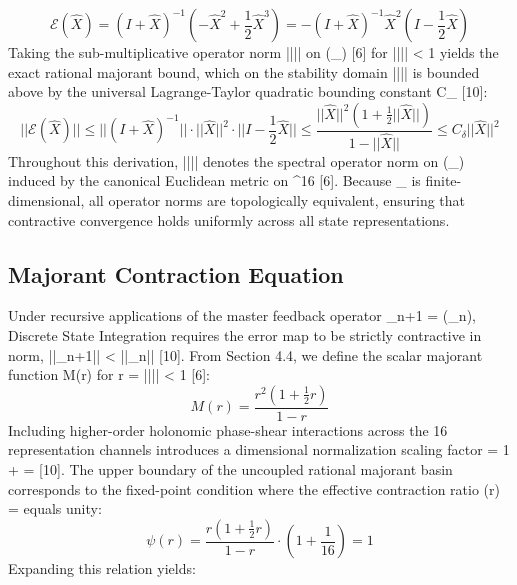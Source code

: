 \documentclass[12pt, a4paper]{article}
\begin{document}
\begin{equation}
\mathcal{E}(\hat{X}) = (I + \hat{X})^{-1}\left(-\hat{X}^{2} + \frac{1}{2}\hat{X}^{3}\right) = -(I + \hat{X})^{-1}\hat{X}^{2}\left(I - \frac{1}{2}\hat{X}\right)
\end{equation}
Taking the sub-multiplicative operator norm ||\cdot|| on (_{}) [6] for |||| < 1 yields the exact rational majorant bound, which on the stability domain |||| \le \delta is bounded above by the universal Lagrange-Taylor quadratic bounding constant C_{\delta}  [10]:
\begin{equation}
||\mathcal{E}(\hat{X})|| \le ||(I + \hat{X})^{-1}|| \cdot ||\hat{X}||^{2} \cdot ||I - \frac{1}{2}\hat{X}|| \le \frac{||\hat{X}||^{2}\left(1 + \frac{1}{2}||\hat{X}||\right)}{1 - ||\hat{X}||} \le C_{\delta}||\hat{X}||^{2}
\end{equation}
Throughout this derivation, ||\cdot|| denotes the spectral operator norm on (_{}) induced by the canonical Euclidean metric on ^{16} [6]. Because _{} is finite-dimensional, all operator norms are topologically equivalent, ensuring that contractive convergence holds uniformly across all state representations.
​\subsection{Majorant Contraction Equation}
Under recursive applications of the master feedback operator _{n+1} = (_{n}), Discrete State Integration requires the error map to be strictly contractive in norm, ||_{n+1}|| < ||_{n}|| [10]. From Section 4.4, we define the scalar majorant function M(r) for r = |||| < 1 [6]:
\begin{equation}
M(r) = \frac{r^{2}\left(1 + \frac{1}{2}r\right)}{1 - r}
\end{equation}
Including higher-order holonomic phase-shear interactions across the 16 representation channels introduces a dimensional normalization scaling factor \mu = 1 + \kappa =  [10]. The upper boundary of the uncoupled rational majorant basin corresponds to the fixed-point condition where the effective contraction ratio \psi(r) = \mu {} equals unity:
\begin{equation}
\psi(r) = \frac{r\left(1 + \frac{1}{2}r\right)}{1 - r} \cdot \left(1 + \frac{1}{16}\right) = 1
\end{equation}
Expanding this relation yields:
\end{document}
